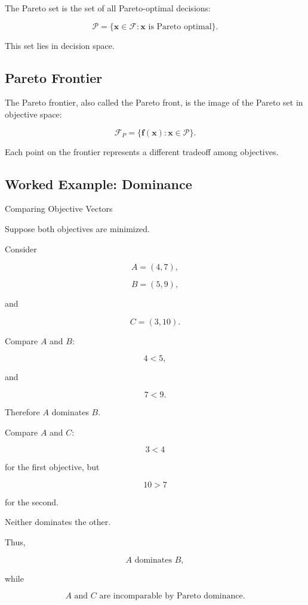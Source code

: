 The Pareto set is the set of all Pareto-optimal decisions:

\[
\boxed{
\mathcal{P}
=
\{
\mathbf{x}\in\mathcal{F}:
\mathbf{x}
\text{ is Pareto optimal}
\}.
}
\]

This set lies in decision space.

\subsection{Pareto Frontier}
\label{subsec:pareto-frontier}

The Pareto frontier, also called the Pareto front, is the image of the
Pareto set in objective space:

\[
\boxed{
\mathcal{F}_P
=
\{
\mathbf{f}(\mathbf{x}):
\mathbf{x}\in\mathcal{P}
\}.
}
\]

Each point on the frontier represents a different tradeoff among
objectives.

\subsection{Worked Example: Dominance}
\label{subsec:worked-dominance}

\begin{workedexamplebox}{Comparing Objective Vectors}

Suppose both objectives are minimized.

Consider

\[
A=(4,7),
\]

\[
B=(5,9),
\]

and

\[
C=(3,10).
\]

Compare \(A\) and \(B\):

\[
4<5,
\]

and

\[
7<9.
\]

Therefore \(A\) dominates \(B\).

Compare \(A\) and \(C\):

\[
3<4
\]

for the first objective, but

\[
10>7
\]

for the second.

Neither dominates the other.

Thus,

\begin{answerbox}
\[
\boxed{
A\text{ dominates }B,
}
\]

while

\[
\boxed{
A\text{ and }C\text{ are incomparable by Pareto dominance}.
}
\]
\end{answerbox}

\end{workedexamplebox}

